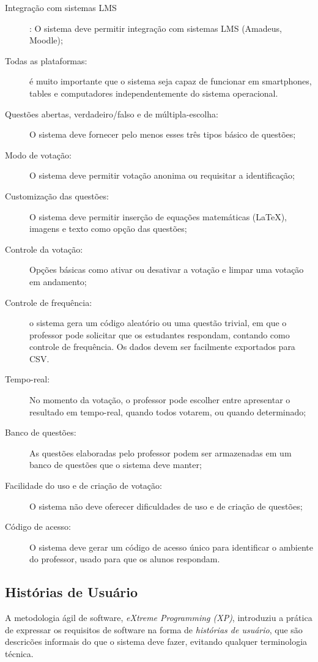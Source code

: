 \begin{description}
\item[Integração com sistemas LMS]: O sistema deve permitir integração com
sistemas LMS (Amadeus, Moodle);
\item[Todas as plataformas:] é muito importante que o sistema seja capaz
de funcionar em smartphones, tables e computadores independentemente
do sistema operacional.
\item[Questões abertas, verdadeiro/falso e de múltipla-escolha:] O sistema
deve fornecer pelo menos esses três tipos básico de questões;
\item[Modo de votação:] O sistema deve permitir votação anonima ou requisitar
a identificação;
\item[Customização das questões:] O sistema deve permitir inserção de equações
matemáticas (\LaTeX), imagens e texto como opção das questões;
\item[Controle da votação:] Opções básicas como ativar ou desativar a votação
e limpar uma votação em andamento;
\item[Controle de frequência:] o sistema gera um código aleatório ou uma
questão trivial, em que o professor pode solicitar que os estudantes
respondam, contando como controle de frequência. Os dados devem ser
facilmente exportados para CSV.
\item[Tempo-real:] No momento da votação, o professor pode escolher entre
apresentar o resultado em tempo-real, quando todos votarem, ou quando
determinado;
\item[Banco de questões:] As questões elaboradas pelo professor podem ser
armazenadas em um banco de questões que o sistema deve manter;
\item[Facilidade do uso e de criação de votação:] O sistema não deve oferecer
dificuldades de uso e de criação de questões;
\item[Código de acesso:] O sistema deve gerar um código de acesso único para
identificar o ambiente do professor, usado para que os alunos respondam.
\end{description}

\subsection{Histórias de Usuário}

A metodologia ágil de software, \textit{eXtreme Programming (XP)}, introduziu a
prática de expressar os requisitos de software na forma de \textit{histórias de usuário},
que são descricões informais do que o sistema deve fazer, evitando qualquer terminologia técnica.

